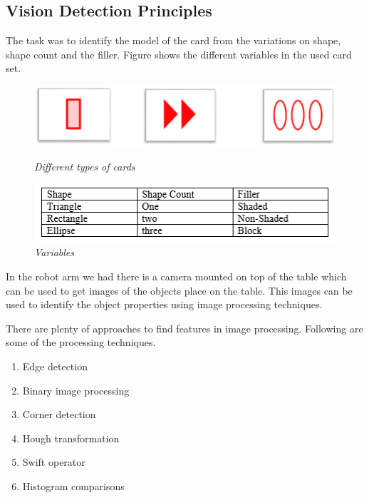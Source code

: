 \subsection{Vision Detection Principles}

The task was to identify the model of the card from the variations on shape, shape count and the filler. Figure shows the different variables in the used card set.

	\begin{figure}[position = here]
		\begin{centering}
			\includegraphics[scale=0.6]{./sachiths_images/image123.png}\\
			\caption[]{\textit{Different types of cards}}
		\end{centering}
	\end{figure}
	
	\begin{figure}[position = here]
		\centering
		\includegraphics[scale=0.8]{./sachiths_images/image2.png}
		\caption[]{\textit{Variables}}
	\end{figure}

In the robot arm we had there is a camera mounted on top of the table which can be used to get images of the objects place on the table. This images can be used to identify the object properties using image processing techniques. 

There are plenty of approaches to find features in image processing. Following are some of the processing techniques.


\begin{enumerate}
	\item Edge detection
	\item Binary image processing\cite{MachineVision}
	\item Corner detection
	\item Hough transformation
	\item Swift operator
	\item Histogram comparisons
\end{enumerate}

